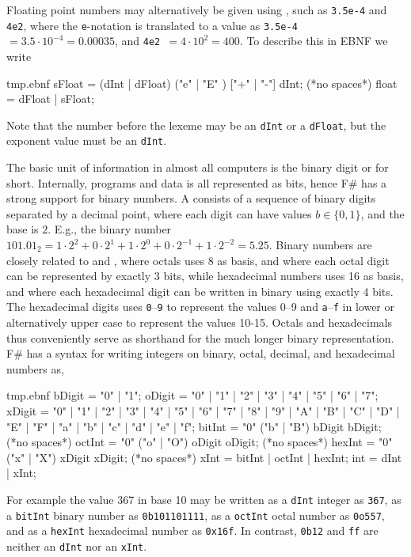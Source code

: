 Floating point numbers may alternatively be given using , such as \lstinline!3.5e-4! and \lstinline!4e2!, where the \lstinline!e!-notation is translated to a value as \lstinline!3.5e-4!~$=3.5\cdot 10^{-4} = 0.00035$, and \lstinline!4e2!~$=4\cdot 10^2=400$. To describe this in EBNF we write
%
\begin{verbatimwrite}{tmp.ebnf}
sFloat = (dInt | dFloat) ("e" | "E" ) ["+" | "-"] dInt; (*no spaces*)
float = dFloat | sFloat;
\end{verbatimwrite}
%
Note that the number before the lexeme  may be an \lstinline[language=ebnf]!dInt! or a \lstinline[language=ebnf]!dFloat!, but the exponent value must be an \lstinline[language=ebnf]!dInt!.

The basic unit of information in almost all computers is the binary digit or  for short. Internally, programs and data is all represented as bits, hence F\# has a strong support for binary numbers. A  consists of a sequence of binary digits separated by a decimal point, where each digit can have values $b \in \{0,1\}$, and the base is $2$. E.g., the binary number $101.01_2 = 1\cdot 2^2+0\cdot 2^1+1\cdot 2^0+0\cdot 2^{-1}+1\cdot 2^{-2}=5.25$. Binary numbers are closely related to  and , where octals uses 8 as basis, and where each octal digit can be represented by exactly 3 bits, while hexadecimal numbers uses 16 as basis, and where each hexadecimal digit can be written in binary using exactly 4 bits. The hexadecimal digits uses \lstinline!0!--\lstinline!9! to represent the values 0--9 and \lstinline!a!--\lstinline!f! in lower or alternatively upper case to represent the values 10-15.  Octals and hexadecimals thus conveniently serve as shorthand for the much longer binary representation. F\# has a syntax for writing integers on binary, octal, decimal, and hexadecimal numbers as,
%
\begin{verbatimwrite}{tmp.ebnf}
bDigit = "0" | "1";
oDigit = "0" | "1" | "2" | "3" | "4" | "5" | "6" | "7";
xDigit =  
  "0" | "1" | "2" | "3" | "4" | "5" | "6" | "7" | "8" | "9"
  | "A" | "B" | "C" | "D" | "E" | "F" | "a" | "b" | "c" | "d" | "e" | "f";
bitInt = "0" ("b" | "B") bDigit {bDigit}; (*no spaces*)
octInt = "0" ("o" | "O") oDigit {oDigit}; (*no spaces*)
hexInt = "0" ("x" | "X") xDigit {xDigit}; (*no spaces*)
xInt = bitInt | octInt | hexInt;
int = dInt | xInt;
\end{verbatimwrite}
%
For example the value 367 in base 10 may be written as a \lstinline[language=ebnf]!dInt! integer as \lstinline[language=ebnf]!367!, as a \lstinline[language=ebnf]!bitInt! binary number as \lstinline!0b101101111!, as a \lstinline[language=ebnf]!octInt! octal number as \lstinline!0o557!, and as a \lstinline[language=ebnf]!hexInt! hexadecimal number as \lstinline!0x16f!. In contrast, \lstinline!0b12! and \lstinline!ff! are neither an \lstinline[language=ebnf]!dInt! nor an \lstinline[language=ebnf]!xInt!.

